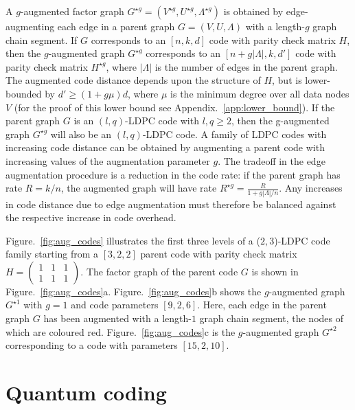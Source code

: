 \documentclass[%
 reprint,
superscriptaddress,
nofootinbib,
 amsmath,amssymb,
secnumarabic
]{revtex4-1}
\begin{document}
A $g$-augmented factor graph $G^{\star g}=(V^{\star g},U^{\star g},\Lambda^{\star g})$ is obtained by edge-augmenting each edge in a parent graph $G=(V, U,\Lambda)$ with a length-$g$ graph chain segment. If $G$ corresponds to an $[n,k,d]$ code with parity check matrix $H$, then the $g$-augmented graph $G^{\star g}$ corresponds to an $[n+g|\Lambda|,k,d']$ code with parity check matrix $H^{\star g}$, where $|\Lambda|$ is the number of edges in the parent graph. The augmented code distance depends upon the structure of $H$, but is lower-bounded by $d'\geq (1+g\mu)d$, where $\mu$ is the minimum degree over all data nodes $V$ (for the proof of this lower bound see Appendix.~\ref{app:lower_bound}). If the parent graph $G$ is an $(l,q)$-LDPC code with $l,q\geq2$, then the g-augmented graph $G^{\star g}$ will also be an $(l,q)$-LDPC code. A family of LDPC codes with increasing code distance can be obtained by augmenting a parent code with increasing values of the augmentation parameter $g$. The tradeoff in the edge augmentation procedure is a reduction in the code rate: if the parent graph has rate $R=k/n$, the augmented graph will have rate $R^{\star g}=\frac{R}{1+g|\Lambda|/n}$. Any increases in code distance due to edge augmentation must therefore be balanced against the respective increase in code overhead.

 Figure.~\ref{fig:aug_codes} illustrates the first three levels of a ($2,3$)-LDPC code family starting from a $[3,2,2]$ parent code with parity check matrix $H=\left(\begin{smallmatrix}1 & 1 &1\\1&1&1\end{smallmatrix}\right)$. The factor graph of the parent code $G$ is shown in Figure.~\ref{fig:aug_codes}a. Figure.~\ref{fig:aug_codes}b shows the $g$-augmented graph $G^{\star 1}$ with $g=1$ and code parameters $[9,2,6]$. Here, each edge in the parent graph $G$ has been augmented with a length-$1$ graph chain segment, the nodes of which are coloured red. Figure.~\ref{fig:aug_codes}c is the $g$-augmented graph $G^{\star 2}$ corresponding to a code with parameters $[15,2,10]$.



\section{Quantum coding}\label{sec:quantum_coding}
\end{document}
